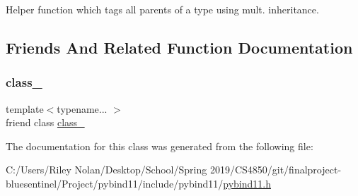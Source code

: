 Helper function which tags all parents of a type using mult. inheritance. 



\subsection{Friends And Related Function Documentation}
\mbox{\label{classgeneric__type_a978adea7a2c683287b544ebc130469fb}} 
\subsubsection{\texorpdfstring{class\_}{class\_}}
{\footnotesize\ttfamily template$<$typename... $>$ \\
friend class \mbox{\hyperlink{classclass__}{class\+\_\+}}\hspace{0.3cm}{\ttfamily [friend]}}



The documentation for this class was generated from the following file\+:\begin{DoxyCompactItemize}
\item 
C\+:/\+Users/\+Riley Nolan/\+Desktop/\+School/\+Spring 2019/\+C\+S4850/git/finalproject-\/bluesentinel/\+Project/pybind11/include/pybind11/\mbox{\hyperlink{pybind11_8h}{pybind11.\+h}}\end{DoxyCompactItemize}
